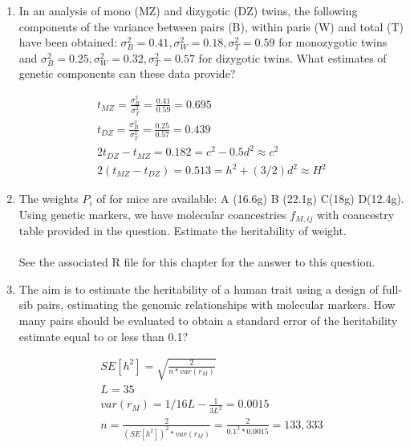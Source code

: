 \documentclass[12pt]{amsart}
\begin{document}
\begin{enumerate}
\item In an analysis of mono (MZ) and dizygotic (DZ) twins, the following components of the variance between pairs (B), within paris (W) and total (T) have been obtained: $\sigma^2_B = 0.41, \sigma^2_W = 0.18, \sigma^2_T = 0.59$ for monozygotic twins and $\sigma^2_B = 0.25, \sigma^2_W = 0.32, \sigma^2_T = 0.57$ for dizygotic twins. What estimates of genetic components can these data provide?

\begin{gather*}
t_{MZ} = \frac{\sigma^2_B}{\sigma^2_T} = \frac{0.41}{0.59} = 0.695\\
t_{DZ} = \frac{\sigma^2_B}{\sigma^2_T} = \frac{0.25}{0.57} = 0.439\\
2t_{DZ} - t_{MZ} = 0.182 = c^2 - 0.5d^2 \approx c^2\\
2(t_{MZ} - t_{DZ}) = 0.513 = h^2 + (3/2)d^2 \approx H^2
\end{gather*}

\item The weights $P_i$ of for mice are available: A (16.6g) B (22.1g) C(18g) D(12.4g). Using genetic markers, we have molecular coancestries $f_{M, ij}$ with coancestry table provided in the question. Estimate the heritability of weight.\\
\\
See the associated R file for this chapter for the answer to this question.
\\
\item The aim is to estimate the heritability of a human trait using a design of full-sib pairs, estimating the genomic relationships with molecular markers. How many pairs should be evaluated to obtain a standard error of the heritability estimate equal to or less than 0.1?

\begin{gather*}
SE[h^2] = \sqrt{\frac{2}{n*var(r_M)}}\\
L = 35\\
var(r_M) = 1/16L - \frac{1}{3L^2} = 0.0015\\
n = \frac{2}{(SE[h^2])^2*var(r_M)} = \frac{2}{0.1^2*0.0015} = 133,333
\end{gather*}

\end{enumerate}
\end{document}
